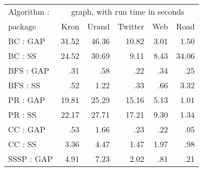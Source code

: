 \begin{table}
\begin{center}
\begin{tabular}{|l|rrrrr|}
\hline
Algorithm :    &   \multicolumn{5}{c|}{graph, with run time in seconds}  \\
 package       &   Kron    &   Urand   &   Twitter  &  Web    &    Road  \\
\hline
BC   : GAP     &  31.52    &  46.36    &  10.82     &  3.01   &    1.50  \\
BC   : SS      &  24.52    &  30.69    &   9.11     &  8.43   &   34.06  \\     %
\hline
BFS  : GAP     &    .31    &    .58    &    .22     &   .34   &     .25  \\
BFS  : SS      &    .52    &   1.22    &    .33     &   .66   &    3.32  \\     %
\hline
\hline
PR   : GAP     &  19.81    &  25.29    &  15.16     &  5.13   &    1.01  \\
PR   : SS      &  22.17    &  27.71    &  17.21     &  9.30   &    1.34  \\     %
\hline
CC   : GAP     &    .53    &   1.66    &    .23     &   .22   &     .05  \\
CC   : SS      &   3.36    &   4.47    &   1.47     &  1.97   &     .98  \\     %
\hline
SSSP : GAP     &   4.91    &   7.23    &   2.02     &   .81   &     .21  \\

\end{tabular}
\end{center}
\end{table}
